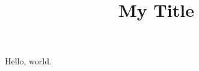 \documentclass{article}
\title{My Title}
\author{}
\date{}
\begin{document}
\maketitle

Hello, world. 
\end{document}
